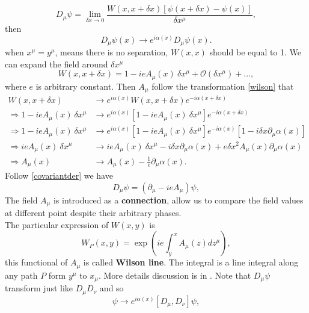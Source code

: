 \documentclass{report}
\newcommand{\nn}{\nonumber}
\numberwithin{equation}{section}
\begin{document}
\begin{equation}
    D_\mu\psi=\lim_{\delta x\rightarrow 0} \frac{W(x,x+\delta x)[\psi(x+\delta x)-\psi(x)]}{\delta x^\mu},
    \label{covariantder}
\end{equation}
then 
\begin{equation}
    D_\mu \psi(x) \rightarrow  e^{i\alpha(x)} D_\mu \psi(x).
\end{equation}
when $x^\mu=y^\mu$, means there is no separation, $W(x,x)$ should be equal to 1. We can expand the field around $\delta x^\mu$
\begin{equation}
W(x,x+\delta x)= 1- i e A_\mu(x)\ \delta x^\mu+ \mathcal{O}(\delta x^\mu)+ ...,    
\end{equation}
where $e$ is arbitrary constant. Then $A_\mu$ follow the transformation \eqref{wilson} that
\begin{align}
W(x,x+\delta x)&\rightarrow   e^{i\alpha(x)} W(x,x +\delta x)e^{-i\alpha(x+\delta x)}\nn\\
\Rightarrow 1- i e A_\mu(x)\ \delta x^\mu &\rightarrow  e^{i\alpha(x)}[1- i e A_\mu(x)\ \delta x^\mu] e^{-i\alpha(x+\delta x)}\nn\\
\Rightarrow 1- i e A_\mu(x)\ \delta x^\mu &\rightarrow  e^{i\alpha(x)}[1- i e A_\mu(x)\ \delta x^\mu] e^{-i\alpha(x)}[1- i\delta x \partial_\mu \alpha(x)]\nn\\
\Rightarrow i e A_\mu(x)\ \delta x^\mu &\rightarrow  i e A_\mu(x)\ \delta x^\mu- i\delta x \partial_\mu \alpha(x)+e \delta x^2 A_\mu(x)\partial_\mu \alpha(x)\nn\\
\Rightarrow  A_\mu(x) &\rightarrow  A_\mu(x)- \frac{1}{e} \partial_\mu \alpha(x).
\end{align}
Follow \eqref{covariantder} we have
\begin{equation}
D_\mu \psi= (\partial_\mu- ie A_\mu) \psi,
\end{equation}
The field $A_\mu$ is introduced as a \textbf{connection}, allow us to compare the field values at different point despite their arbitrary phases.\\
The particular expression of $W(x,y)$ is 
\begin{equation}
W_P(x,y)=\exp \left( ie\int_y^x A_\mu (z)dz^\mu \right) ,
\end{equation}
this functional of $A_\mu$ is called \textbf{Wilson line}. The integral is a line integral along any path $P$ form $y^\mu$ to $x_\mu$. More details discussion is in \cite{Schwartz:2014sze}.
Note that $D_\mu \psi$ transform just like $D_\mu D_\nu$ and so 
\begin{equation}
[D_\mu ,D_\nu]\psi \rightarrow e^{i\alpha(x)}[D_\mu ,D_\nu]\psi,
\end{equation}
\end{document}
